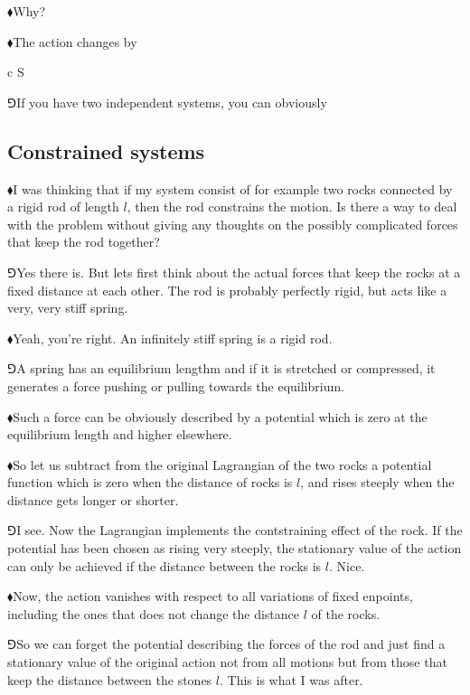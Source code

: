 \documentclass[11pt,oneside%
]{memoir}
\newenvironment{eqna}{\begin{IEEEeqnarray*}{c}}{\end{IEEEeqnarray*}\ignorespacesafterend}
\newcommand{\hea}{\(\blacklozenge\)\;}
\newcommand{\heb}{\(\Game\)\;}
\begin{document}
\hea Why?

\hea The action changes by
\begin{eqna}
    S\rightarrow \int{}
\end{eqna}




\heb If you have two independent systems, you can obviously 
\subsection{Constrained systems}
\hea I was thinking that if my system consist of for example two rocks connected by a rigid rod of length \(l\), then the rod constrains the motion. Is there a way to deal with the problem without giving any thoughts on the possibly complicated forces that keep the rod together?

\heb Yes there is. But lets first think about the actual forces that keep the rocks at a fixed distance at each other. The rod is probably perfectly rigid, but acts like a very, very stiff spring.

\hea Yeah, you're right. An infinitely stiff spring is a rigid rod.

\heb A spring has an equilibrium lengthm and if it is stretched or compressed, it generates a force pushing or pulling towards the equilibrium.

\hea Such a force can be obviously described by a potential which is zero at the equilibrium length and higher elsewhere.

\hea So let us subtract from the original Lagrangian of the two rocks a potential function which is zero when the distance of rocks is \(l\), and rises steeply when the distance gets longer or shorter. 

\heb I see. Now the Lagrangian implements the contstraining effect of the rock. If the potential has been chosen as rising very steeply, the stationary value of the action can only be achieved if the distance between the rocks is \(l\). Nice.

\hea Now, the action vanishes with respect to all variations of fixed enpoints, including the ones that does not change the distance \(l\) of the rocks.

\heb So we can forget the potential describing the forces of the rod and just find a stationary value of the original action not from all motions but from those that keep the distance between the stones \(l\). This is what I was after.
\end{document}
